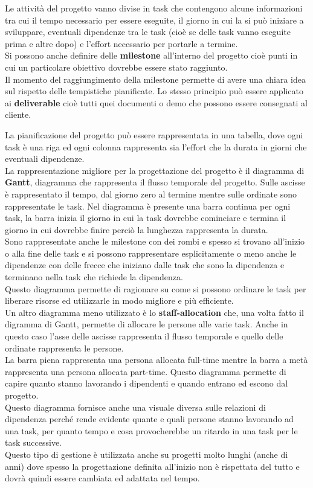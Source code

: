 Le attività del progetto vanno divise in task che contengono alcune informazioni tra cui il tempo necessario per essere eseguite, il giorno in cui la si può iniziare a sviluppare, eventuali dipendenze tra le task (cioè se delle task vanno eseguite prima e altre dopo) e l'effort necessario per portarle a termine.\\
Si possono anche definire delle \textbf{milestone} all'interno del progetto cioè punti in cui un particolare obiettivo dovrebbe essere stato raggiunto.\\
Il momento del raggiungimento della milestone permette di avere una chiara idea sul rispetto delle tempistiche pianificate.
Lo stesso principio può essere applicato ai \textbf{deliverable} cioè tutti quei documenti o demo che possono essere consegnati al cliente.

La pianificazione del progetto può essere rappresentata in una tabella, dove ogni task è una riga ed ogni colonna rappresenta sia l'effort che la durata in giorni che eventuali dipendenze.\\
La rappresentazione migliore per la progettazione del progetto è il diagramma di \textbf{Gantt}, diagramma che rappresenta il flusso temporale del progetto.
Sulle ascisse è rappresentato il tempo, dal giorno zero al termine mentre sulle ordinate sono rappresentate le task.
Nel diagramma è presente una barra continua per ogni task, la barra inizia il giorno in cui la task dovrebbe cominciare e termina il giorno in cui dovrebbe finire perciò la lunghezza rappresenta la durata.\\
Sono rappresentate anche le milestone con dei rombi e spesso si trovano all'inizio o alla fine delle task e si possono rappresentare esplicitamente o meno anche le dipendenze con delle frecce che iniziano dalle task che sono la dipendenza e terminano nella task che richiede la dipendenza.\\
Questo diagramma permette di ragionare su come si possono ordinare le task per liberare risorse ed utilizzarle in modo migliore e più efficiente.\\
Un altro diagramma meno utilizzato è lo \textbf{staff-allocation} che, una volta fatto il digramma di Gantt, permette di allocare le persone alle varie task.
Anche in questo caso l'asse delle ascisse rappresenta il flusso temporale e quello delle ordinate rappresenta le persone.\\
La barra piena rappresenta una persona allocata full-time mentre la barra a metà rappresenta una persona allocata part-time.
Questo diagramma permette di capire quanto stanno lavorando i dipendenti e quando entrano ed escono dal progetto.\\
Questo diagramma fornisce anche una visuale diversa sulle relazioni di dipendenza perché rende evidente quante e quali persone stanno lavorando ad una task, per quanto tempo e cosa provocherebbe un ritardo in una task per le task successive.\\
Questo tipo di gestione è utilizzata anche su progetti molto lunghi (anche di anni) dove spesso la progettazione definita all'inizio non è rispettata del tutto e dovrà quindi essere cambiata ed adattata nel tempo.


